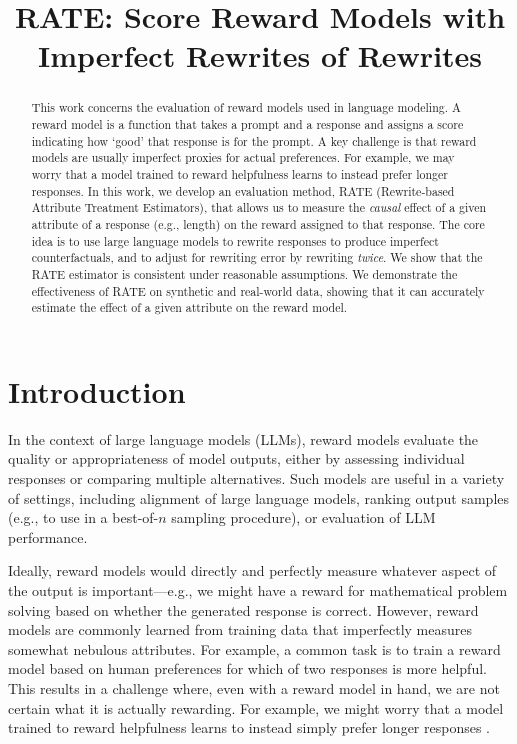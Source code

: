 \documentclass{article}
\title{RATE: Score Reward Models with Imperfect Rewrites of Rewrites}
\begin{document}
\maketitle

\begin{abstract}
This work concerns the evaluation of reward models used in language modeling. A reward model is a function that takes a prompt and a response and assigns a score indicating how `good' that response is for the prompt. A key challenge is that reward models are usually imperfect proxies for actual preferences. For example, we may worry that a model trained to reward helpfulness learns to instead prefer longer responses. 
In this work, we develop an evaluation method, RATE (Rewrite-based Attribute Treatment Estimators), that allows us to measure the \emph{causal} effect of a given attribute of a response (e.g., length) on the reward assigned to that response. 
The core idea is to use large language models to rewrite responses to produce imperfect counterfactuals, and to adjust for rewriting error by rewriting \emph{twice}. We show that the RATE estimator is consistent under reasonable assumptions. We demonstrate the effectiveness of RATE on synthetic and real-world data, showing that it can accurately estimate the effect of a given attribute on the reward model.
\end{abstract}
  
\section{Introduction}
\label{sec:introduction}
In the context of large language models (LLMs), reward models evaluate the quality or appropriateness of model outputs, either by assessing individual responses or comparing multiple alternatives. Such models are useful in a variety of settings, including alignment of large language models, ranking output samples (e.g., to use in a best-of-$n$ sampling procedure), or evaluation of LLM performance.

Ideally, reward models would directly and perfectly measure whatever aspect of the output is important---e.g., we might have a reward for mathematical problem solving based on whether the generated response is correct. 
However, reward models are commonly learned from training data that imperfectly measures somewhat nebulous attributes. For example, a common task is to train a reward model based on human preferences for which of two responses is more helpful.
This results in a challenge where, even with a reward model in hand, we are not certain what it is actually rewarding.
For example, we might worry that a model trained to reward helpfulness learns to instead simply prefer longer responses \citep{shen2023looselipssinkships, park2024disentanglinglengthqualitydirect,singhal2024longwaygoinvestigating}.
\end{document}
